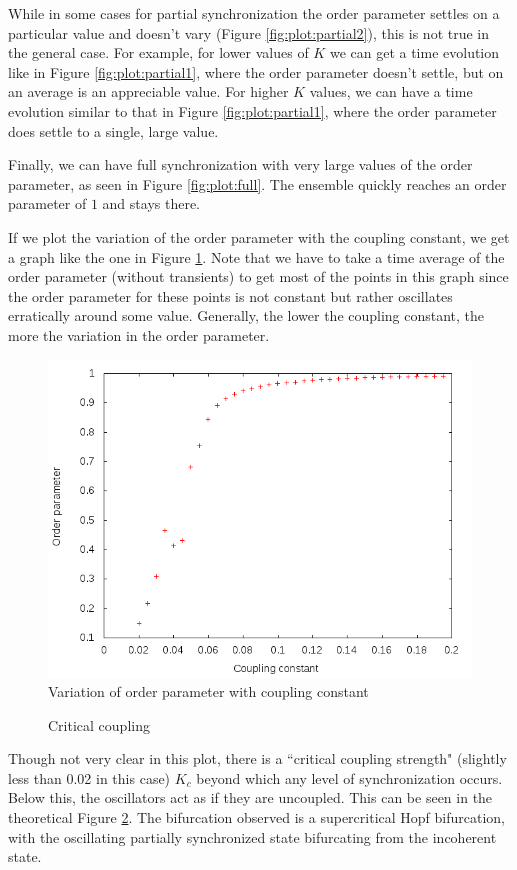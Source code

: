 \documentclass[12pt]{article}
\begin{document}
While in some cases for partial synchronization the order parameter settles on a particular value and doesn't vary (Figure \ref{fig:plot:partial2}), this is not true in the general case. For example, for lower values of $K$ we can get a time evolution like in Figure \ref{fig:plot:partial1}, where the order parameter doesn't settle, but on an average is an appreciable value. For higher $K$ values, we can have a time evolution similar to that in Figure \ref{fig:plot:partial1}, where the order parameter does settle to a single, large value.


Finally, we can have full synchronization with very large values of the order parameter, as seen in Figure \ref{fig:plot:full}. The ensemble quickly reaches an order parameter of $1$ and stays there.

If we plot the variation of the order parameter with the coupling constant, we get a graph like the one in Figure \ref{fig:plot:ovc}. Note that we have to take a time average of the order parameter (without transients) to get most of the points in this graph since the order parameter for these points is not constant but rather oscillates erratically around some value. Generally, the lower the coupling constant, the more the variation in the order parameter.

\begin{figure}
\centering
\includegraphics[scale=0.5]{data/ovcoupling}
\caption{Variation of order parameter with coupling constant}
\label{fig:plot:ovc}
\end{figure}
\begin{figure}
\centering


\caption{Critical coupling}\label{fig:crit}
\end{figure}
Though not very clear in this plot, there is a ``critical coupling strength" (slightly less than 0.02 in this case) $K_c$ beyond which any level of synchronization occurs. Below this, the oscillators act as if they are uncoupled. This can be seen in the theoretical Figure \ref{fig:crit}. The bifurcation observed is a supercritical Hopf bifurcation\cite{niu2014bifurcation}, with the oscillating partially synchronized state bifurcating from the incoherent state.
\end{document}
